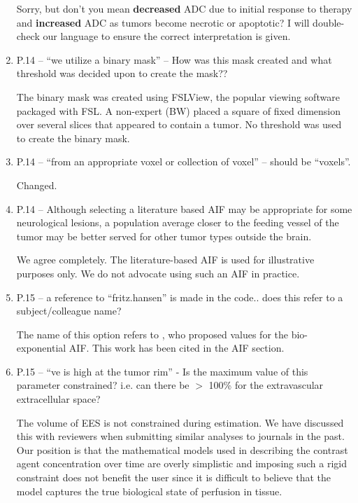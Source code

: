 \documentclass[11pt]{article}
\begin{document}
\begin{enumerate}
  Sorry, but don't you mean \textbf{decreased} ADC due to initial
  response to therapy and \textbf{increased} ADC as tumors become
  necrotic or apoptotic?  I will double-check our language to ensure
  the correct interpretation is given.

\item P.14 – ``we utilize a binary mask'' – How was this mask created
  and what threshold was decided upon to create the mask??

  The binary mask was created using FSLView, the popular viewing
  software packaged with FSL.  A non-expert (BW) placed a square of
  fixed dimension over several slices that appeared to contain a
  tumor.  No threshold was used to create the binary mask.

\item P.14 – ``from an appropriate voxel or collection of voxel'' –
  should be ``voxels''.

  Changed.

\item P.14 – Although selecting a literature based AIF may be
  appropriate for some neurological lesions, a population average
  closer to the feeding vessel of the tumor may be better served for
  other tumor types outside the brain.

  We agree completely.  The literature-based AIF is used for
  illustrative purposes only.  We do not advocate using such an AIF in
  practice.

\item P.15 – a reference to ``fritz.hansen'' is made in the
  code.. does this refer to a subject/colleague name?

  The name of this option refers to \citet{fri-etal:measurement}, who
  proposed values for the bio-exponential AIF.  This work has been
  cited in the AIF section.

\item P.15 – ``ve is high at the tumor rim'' - Is the maximum value of
  this parameter constrained? i.e. can there be $>$ 100\% for the
  extravascular extracellular space?

  The volume of EES is not constrained during estimation.  We have
  discussed this with reviewers when submitting similar analyses to
  journals in the past.  Our position is that the mathematical models
  used in describing the contrast agent concentration over time are
  overly simplistic and imposing such a rigid constraint does not
  benefit the user since it is difficult to believe that the model
  captures the true biological state of perfusion in tissue.


\end{enumerate}
\end{document}
